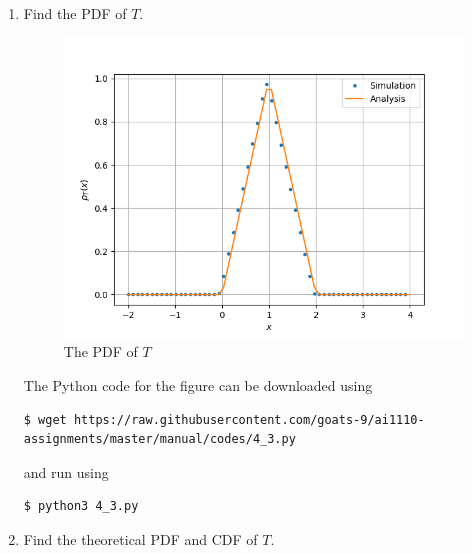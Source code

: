 \documentclass[journal,12pt,twocolumn]{IEEEtran}
\renewcommand\thesection{\arabic{section}}
\begin{document}
\begin{enumerate}[label=\thesection.\arabic*
,ref=\thesection.\theenumi]
\solution
The Python code for the figure is at
\begin{lstlisting}
$ wget https://raw.githubusercontent.com/goats-9/ai1110-assignments/master/manual/codes/4_2.py
\end{lstlisting}
and can be run using
\begin{lstlisting}
$ python3 4_2.py
\end{lstlisting}
\item Find the PDF of $T$.
	\begin{figure}
		\includegraphics[width=\columnwidth]{figs/4_3.png}
		\caption{The PDF of $T$}
		\label{fig:tri-pdf}
	\end{figure}

\solution
The Python code for the figure can be downloaded using 
\begin{lstlisting}
$ wget https://raw.githubusercontent.com/goats-9/ai1110-assignments/master/manual/codes/4_3.py
\end{lstlisting}
and run using
\begin{lstlisting}
$ python3 4_3.py
\end{lstlisting}

\item Find the theoretical PDF and CDF of $T$.


\end{enumerate}
\end{document}
